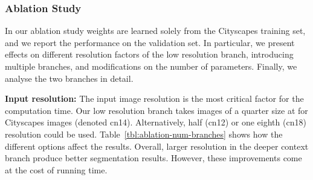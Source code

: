 \documentclass[runningheads]{llncs}
\newcommand{\subsubsubsection}[1]{\vspace{0.2em}\noindent\textbf{\textcolor[rgb]{0,.1,.4}{#1:}}}
\begin{document}
\subsubsection{Ablation Study}\label{ssec:ablation-study}
In our ablation study weights are learned solely from the Cityscapes training set, and we report the performance on the validation set. In particular, we present effects on different resolution factors of the low resolution branch, introducing multiple branches, and modifications on the number of parameters. Finally, we analyse the two branches in detail.

\begin{table}[t]
\begin{center}
    \end{center}
    \caption{ContextNet (cn14) compared to its version with half resolution (cn12) and eighth resolution (cn18) at the low resolution branch, and with multiple levels at quarter, half and full resolution (cn124) on Cityscapes validation set. Implementations with smaller memory footprint are also shown (cn14-500 and cn14-160).} \label{tbl:ablation-num-branches}
\end{table}

\subsubsubsection{Input resolution} The input image resolution is the most critical factor for the computation time. Our low resolution branch takes images of a quarter size at  for Cityscapes images (denoted cn14). Alternatively, half (cn12) or one eighth (cn18) resolution could be used. Table~\ref{tbl:ablation-num-branches} shows how the different options affect the results. Overall, larger resolution in the deeper context branch produce better segmentation results. However, these improvements come at the cost of running time.
\end{document}
